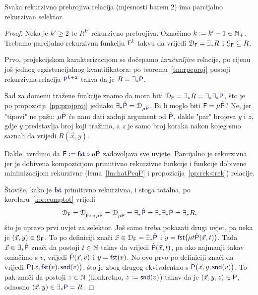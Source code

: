 \begin{lema}\label{lm:tmsel}
Svaka rekurzivno prebrojiva relacija (mjesnosti barem $2$) ima parcijalno rekurzivan selektor.
\end{lema}
\begin{proof}
Neka je $k'\ge2$ te $R^{k'}$ rekurzivno prebrojiva. Označimo $k:=k'-1\in{\mathbb N}_+$. Trebamo parcijalno rekurzivnu funkciju $\f F^k$ takvu da vrijedi $\dom{\f F}=\exists_*R$ i $\graf{\f F}\subseteq R$. 

Prvo, projekcijskom karakterizacijom se dočepamo \emph{izračunljive} relacije, po cijenu još jednog egzistencijalnog kvantifikatora: po teoremu~\ref{tm:rpeproj} postoji rekurzivna relacija $\f P^{k+2}$ takva da je $R=\exists_*\f P$.

Sad za domenu tražene funkcije znamo da mora biti $\dom{\f F}=\exists_*R=\exists_*\exists_*\f P$, što je po propoziciji~\ref{pp:projproj} jednako $\exists_*\hat{\f P}=\dom{\mu\hat{\f P}}$. Bi li moglo biti $\f F=\mu\hat{\f P}$? Ne, jer "tipovi" ne pašu: $\mu\hat{\f P}$ će nam dati zadnji argument od $\hat{\f P}$, dakle "par" brojeva $y$ i $z$, gdje $y$ predstavlja broj koji tražimo, a $z$ je samo broj koraka nakon kojeg smo saznali da vrijedi $R(\vec x,y)$.

Dakle, tvrdimo da $\f F:=\f{fst}\circ\mu\hat{\f P}$ zadovoljava sve uvjete. Parcijalno je rekurzivna jer je dobivena kompozicijom primitivno rekurzivne funkcije i funkcije dobivene minimizacijom rekurzivne (lema~\ref{lm:hatPeqP} i propozicija~\ref{pp:rek<rek}) relacije.

    Štoviše, kako je $\f{fst}$ primitivno rekurzivna, i stoga totalna, po korolaru~\ref{kor:comptot} vrijedi
\begin{equation}
    \dom{\f F}=\dom{\f{fst}\,\circ\,\mu\hat{\f P}}=\dom{\mu\hat{\f P}}=\exists_*\hat{\f P}=\exists_*\exists_*\f P=\exists_*R\text,
\end{equation}
što je upravo prvi uvjet za selektor. Još samo treba pokazati drugi uvjet, pa neka je $(\vec x,y)\in\graf{\f F}$. To po definiciji znači $\vec x\in\dom{\f F}=\exists_*\hat{\f P}$ i
$y=\f{fst}\bigl(\mu t\hat{\f P}(\vec x,t)\bigr)$. Tada $\vec x\in\exists_*\hat{\f P}$ znači da postoji $t\in{\mathbb N}$ takav da vrijedi $\hat{\f P}(\vec x,t)$, 
pa ako najmanji takav označimo s $v$, vrijedi 
$\hat{\f P}(\vec x,v)$ i $y=\f{fst}(v)$. No ovo prvo po definiciji znači da vrijedi $\f P\bigl(\vec x,\f{fst}(v),\f{snd}(v)\bigr)$, što je zbog drugog ekvivalentno s $\f P\bigl(\vec x,y,\f{snd}(v)\bigr)$. To pak znači da postoji $z\in{\mathbb N}$ (konkretno, $z:=\f{snd}(v)$) takav da je $(\vec x,y,z)\in\f P$, odnosno $(\vec x,y)\in\exists_*\f P=R$.
\end{proof}


